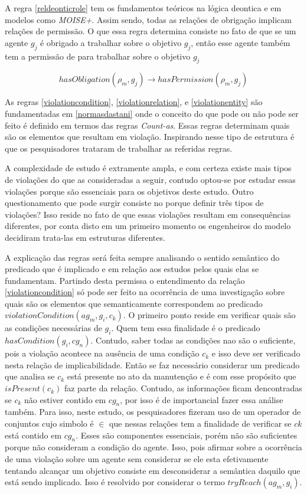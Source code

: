 A regra \ref{reldeonticrole} tem os fundamentos teóricos na lógica deontica e em modelos como \textit{MOISE+}. Assim sendo, todas as relações de obrigação
implicam relações de permissão. O que essa regra determina consiste no fato de que se um agente $g_j$ é obrigado a trabalhar sobre o objetivo $g_j$, 
então esse agente também tem a permissão de para trabalhar sobre o objetivo $g_j$ 

\begin{equation}\label{reldeonticrole}
	hasObligation(\rho_m,g_j) \to hasPermission(\rho_m,g_j)  
\end{equation}

As regras \ref{violationcondition}, \ref{violationrelation}, e \ref{violationentity} são fundamentadas em \ref{normasdastani} onde o conceito do que 
pode ou não pode ser feito é definido em termos das regras \textit{Count-as}. Essas regras determinam quais são os elementos que resultam em violação. 
Inspirando nesse tipo de estrutura é que os pesquisadores trataram de trabalhar as referidas regras. 

A complexidade de estudo é extramente ampla, e com certeza existe mais tipos de violações do que as consideradas a seguir, contudo optou-se por estudar essas 
violações porque são essenciais para os objetivos deste estudo. Outro questionamento que pode surgir consiste no porque definir três tipos de violações? 
Isso reside no fato de que essas violações resultam em consequências diferentes, por conta disto em um primeiro momento os engenheiros do modelo decidiram 
trata-las em estruturas diferentes. 

A explicação das regras será feita sempre analisando o sentido semântico do predicado que é implicado e em relação aos estudos pelos quais elas se fundamentam. 
Partindo desta permissa o entendimento da relação \ref{violationcondition} só pode ser feito na ocorrência de uma  investigação sobre quais são os elementos 
que semanticamente correspondem ao predicado $violationCondition(ag_m,g_i,c_k)$. O primeiro ponto reside em verificar quais são as condições necessárias
de $g_i$. Quem tem essa finalidade é o predicado $hasCondition(g_i,cg_n)$. Contudo, saber todas as condições nao são o suficiente, pois a violação 
acontece na ausência de uma condição $c_k$ e isso deve ser verificado nesta relação de implicabilidade. Então se faz necessário considerar um predicado 
que analisa se $c_k$ está presente no ato da manutenção e é com esse propósito que $isPresent(c_k)$ faz parte da relação. Contudo, as informações
ficam dencontradas se $c_k$ não estiver contido em $cg_n$, por isso é de importancial fazer essa análise também. Para isso, neste estudo, os pesquisadores
fizeram uso de um operador de conjuntos cujo simbolo é $\in$ que nessas relações tem a finalidade de verificar se $ck$ está contido em $cg_n$. Esses são
componentes essenciais, porém não são suficientes porque não consideram a condição do agente. Isso, pois afirmar sobre a ocorrência de uma violação sobre 
um agente sem considerar se ele esta efetivamente tentando alcançar um objetivo consiste em desconsiderar a semântica daquilo que está sendo implicado. 
Isso é resolvido por considerar o termo  $tryReach(ag_m,g_i)$. 

